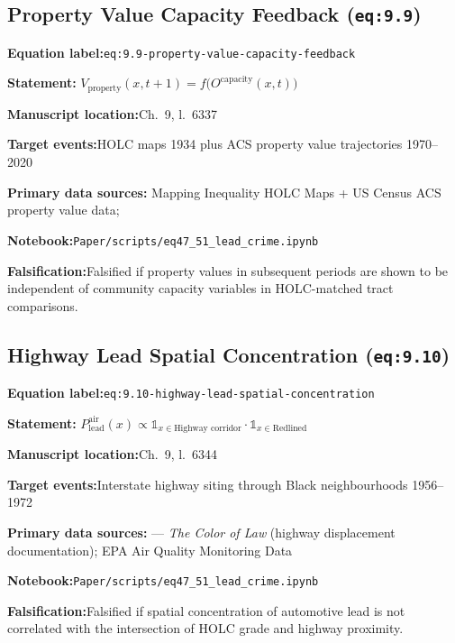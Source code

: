 \documentclass[12pt]{article}
\newcommand{\TierOne}{\textcolor{green!60!black}{\textbf{T1}}}
\newcommand{\caserow}[2]{%
  \noindent\textbf{#1:}\enspace #2\par\smallskip}
\begin{document}
\subsection{Property Value Capacity Feedback (\texttt{eq:9.9})}

\begin{tcolorbox}[caseblock, title={%
  \TierOne\quad Property Value Capacity Feedback}]

\caserow{Equation label}{\texttt{eq:9.9-property-value-capacity-feedback}}
\caserow{Statement}{%
  $V_{\text{property}}(x,t+1) = f\!\bigl(O^{\text{capacity}}(x,t)\bigr)$}
\caserow{Manuscript location}{Ch.~9, l.~6337}
\caserow{Target events}{HOLC maps 1934 plus ACS property value
  trajectories 1970--2020}
\caserow{Primary data sources}{%
  Mapping Inequality HOLC Maps + US Census ACS property value data;
  \textcite{rothstein}}
\caserow{Notebook}{\texttt{Paper/scripts/eq47\_51\_lead\_crime.ipynb}}
\caserow{Falsification}{Falsified if property values in subsequent
  periods are shown to be independent of community capacity
  variables in HOLC-matched tract comparisons.}

\end{tcolorbox}

\subsection{Highway Lead Spatial Concentration (\texttt{eq:9.10})}

\begin{tcolorbox}[caseblock, title={%
  \TierOne\quad Highway Lead Spatial Concentration}]

\caserow{Equation label}{\texttt{eq:9.10-highway-lead-spatial-concentration}}
\caserow{Statement}{%
  $P_{\text{lead}}^{\text{air}}(x) \propto
   \mathbb{1}_{x \in \text{Highway corridor}}
   \cdot \mathbb{1}_{x \in \text{Redlined}}$}
\caserow{Manuscript location}{Ch.~9, l.~6344}
\caserow{Target events}{Interstate highway siting through Black
  neighbourhoods 1956--1972}
\caserow{Primary data sources}{%
  \textcite{rothstein} --- \textit{The Color of Law}
  (highway displacement documentation);
  EPA Air Quality Monitoring Data}
\caserow{Notebook}{\texttt{Paper/scripts/eq47\_51\_lead\_crime.ipynb}}
\caserow{Falsification}{Falsified if spatial concentration of
  automotive lead is not correlated with the intersection of HOLC
  grade and highway proximity.}

\end{tcolorbox}

\end{document}
